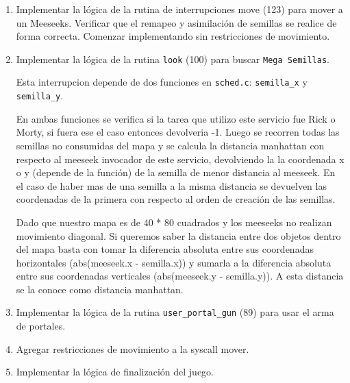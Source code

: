 \documentclass[a4paper]{article}
\begin{document}
\begin{enumerate}
	\item Implementar la lógica de la rutina de interrupciones move (123) para mover a un Meeseeks. Verificar que el remapeo y asimilación de semillas se realice de forma correcta. Comenzar implementando sin restricciones de movimiento.
	
	\item Implementar la lógica de la rutina \texttt{look} (100) para buscar \texttt{Mega Semillas}.
	
	Esta interrupcion depende de dos funciones en \texttt{sched.c}: \texttt{semilla\_x} y \texttt{semilla\_y}.
	
	
	En ambas funciones se verifica si la tarea que utilizo este servicio fue Rick o Morty, si fuera ese el caso entonces devolveria -1. Luego se recorren todas las semillas no consumidas del mapa y se calcula la distancia manhattan con respecto al meeseek invocador de este servicio, devolviendo la la coordenada x o y (depende de la funci\'on) de la semilla de menor distancia al meeseek.
	En el caso de haber mas de una semilla a la misma distancia se devuelven las coordenadas de la primera con respecto al orden de creación de las semillas.
	
	Dado que nuestro mapa es de 40 * 80 cuadrados y los meeseeks no realizan movimiento diagonal. Si queremos saber la distancia entre dos objetos dentro del mapa basta con tomar la diferencia absoluta entre sus coordenadas horizontales (abs(meeseek.x - semilla.x)) y sumarla a la diferencia absoluta entre sus coordenadas verticales (abs(meeseek.y - semilla.y)). A esta distancia se la conoce como distancia manhattan.
	
	\item Implementar la lógica de la rutina \texttt{user\_portal\_gun} (89) para usar el arma de portales.
	
	\item Agregar restricciones de movimiento a la syscall mover.
	
	\item Implementar la lógica de finalización del juego.
	
\end{enumerate}
\end{document}
